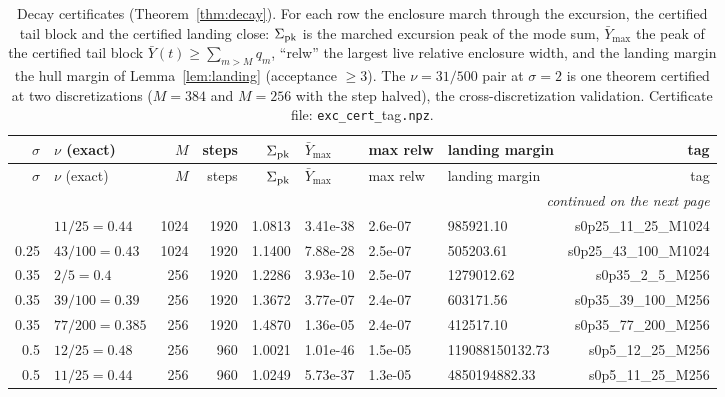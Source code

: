 
\begin{center}
\scriptsize
\setlength{\tabcolsep}{3.5pt}
\begin{longtable}{@{}rlrrrlllr@{}}
\caption{Decay certificates (Theorem~\ref{thm:decay}). For each row the enclosure march through the excursion, the certified tail block and the certified landing close: $\Sigma_{\rm pk}$ is the marched excursion peak of the mode sum, $\bar Y_{\max}$ the peak of the certified tail block $\bar Y(t)\ge\sum_{m>M}q_m$, ``relw'' the largest live relative enclosure width, and the landing margin the hull margin of Lemma~\ref{lem:landing} (acceptance $\ge3$). The $\nu=31/500$ pair at $\sigma=2$ is one theorem certified at two discretizations ($M=384$ and $M=256$ with the step halved), the cross-discretization validation. Certificate file: \texttt{exc\_cert\_}tag\texttt{.npz}.}\label{tab:decay}\\
\toprule
$\sigma$ & $\nu$ (exact) & $M$ & steps & $\Sigma_{\rm pk}$ & $\bar Y_{\max}$ & max relw & landing margin & tag\\
\midrule
\endfirsthead
\toprule
$\sigma$ & $\nu$ (exact) & $M$ & steps & $\Sigma_{\rm pk}$ & $\bar Y_{\max}$ & max relw & landing margin & tag\\
\midrule
\endhead
\midrule\multicolumn{9}{r}{\emph{continued on the next page}}\\
\endfoot
\bottomrule
\endlastfoot
0.25 & $11/25=0.44$ & 1024 & 1920 & 1.0813 & 3.41e-38 & 2.6e-07 & 985921.10 & s0p25\_11\_25\_M1024\\
0.25 & $43/100=0.43$ & 1024 & 1920 & 1.1400 & 7.88e-28 & 2.5e-07 & 505203.61 & s0p25\_43\_100\_M1024\\
0.35 & $2/5=0.4$ & 256 & 1920 & 1.2286 & 3.93e-10 & 2.5e-07 & 1279012.62 & s0p35\_2\_5\_M256\\
0.35 & $39/100=0.39$ & 256 & 1920 & 1.3672 & 3.77e-07 & 2.4e-07 & 603171.56 & s0p35\_39\_100\_M256\\
0.35 & $77/200=0.385$ & 256 & 1920 & 1.4870 & 1.36e-05 & 2.4e-07 & 412517.10 & s0p35\_77\_200\_M256\\
0.5 & $12/25=0.48$ & 256 & 960 & 1.0021 & 1.01e-46 & 1.5e-05 & 119088150132.73 & s0p5\_12\_25\_M256\\
0.5 & $11/25=0.44$ & 256 & 960 & 1.0249 & 5.73e-37 & 1.3e-05 & 4850194882.33 & s0p5\_11\_25\_M256\\

\end{longtable}
\end{center}
